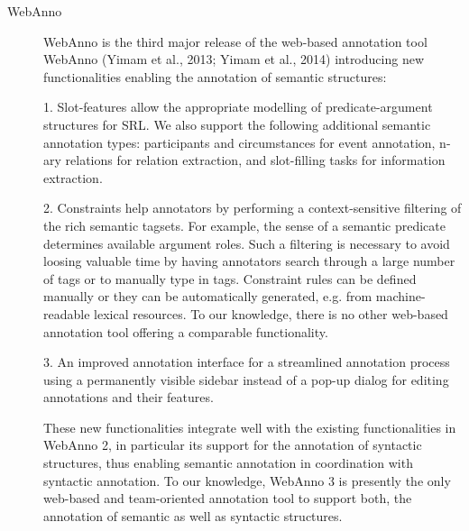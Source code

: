 \begin{description}
    \item[WebAnno]
    WebAnno is the third major release of the web-based annotation tool WebAnno (Yimam et al., 2013;
    Yimam et al., 2014) introducing new functionalities enabling the annotation of semantic structures:

    1. Slot-features allow the appropriate modelling of predicate-argument structures for SRL. We also
    support the following additional semantic annotation types: participants and circumstances for event
    annotation, n-ary relations for relation extraction, and slot-filling tasks for information extraction.

    2. Constraints help annotators by performing a context-sensitive filtering of the rich semantic tagsets.
    For example, the sense of a semantic predicate determines available argument roles. Such a filtering is
    necessary to avoid loosing valuable time by having annotators search through a large number of tags
    or to manually type in tags. Constraint rules can be defined manually or they can be automatically
    generated, e.g. from machine-readable lexical resources. To our knowledge, there is no other
    web-based annotation tool offering a comparable functionality.

    3. An improved annotation interface for a streamlined annotation process using a permanently visible
    sidebar instead of a pop-up dialog for editing annotations and their features.

    These new functionalities integrate well with the existing functionalities in WebAnno 2, in particular its
    support for the annotation of syntactic structures, thus enabling semantic annotation in coordination with
    syntactic annotation. To our knowledge, WebAnno 3 is presently the only web-based and team-oriented
    annotation tool to support both, the annotation of semantic as well as syntactic structures. 


\end{description}
